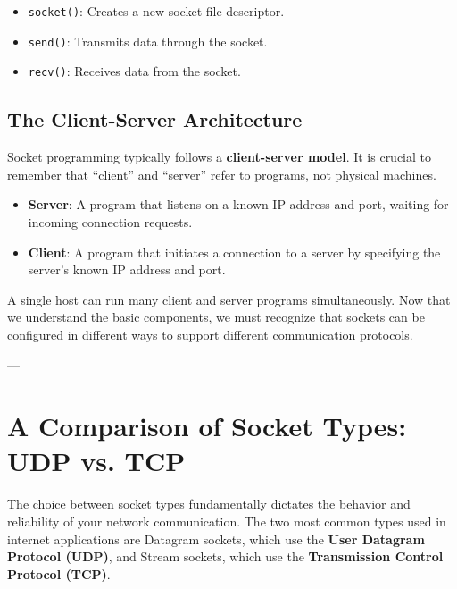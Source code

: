 \documentclass{article}
\begin{document}
\begin{itemize}
    \item \texttt{socket()}: Creates a new socket file descriptor.
    \item \texttt{send()}: Transmits data through the socket.
    \item \texttt{recv()}: Receives data from the socket.
\end{itemize}

\subsection{The Client-Server Architecture}

Socket programming typically follows a \textbf{client-server model}. It is crucial to remember that ``client'' and ``server'' refer to programs, not physical machines.

\begin{itemize}
    \item \textbf{Server}: A program that listens on a known IP address and port, waiting for incoming connection requests.
    \item \textbf{Client}: A program that initiates a connection to a server by specifying the server's known IP address and port.
\end{itemize}

A single host can run many client and server programs simultaneously. Now that we understand the basic components, we must recognize that sockets can be configured in different ways to support different communication protocols.

---

\section[A Comparison of Socket Types]{A Comparison of Socket Types: UDP vs. TCP}

The choice between socket types fundamentally dictates the behavior and reliability of your network communication. The two most common types used in internet applications are Datagram sockets, which use the \textbf{User Datagram Protocol (UDP)}, and Stream sockets, which use the \textbf{Transmission Control Protocol (TCP)}.
\end{document}
